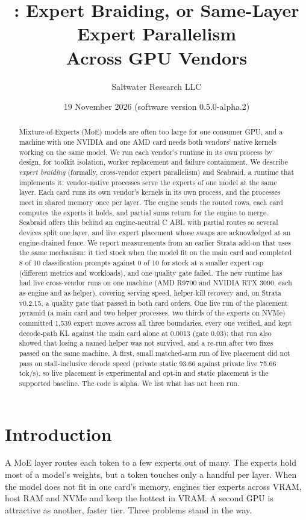 \documentclass[11pt]{article}
\title{\product: Expert Braiding, or Same-Layer Expert Parallelism\\ Across GPU Vendors}
\author{Saltwater Research LLC}
\date{19 November 2026 \quad (software version 0.5.0-alpha.2)}
\newcommand{\product}{Seabraid}                 %
\begin{document}
\maketitle

\begin{abstract}
Mixture-of-Experts (MoE) models are often too large for one consumer GPU, and a machine with one NVIDIA and one AMD
card needs both vendors' native kernels working on the same model. We run each vendor's runtime in its own process by
design, for toolkit isolation, worker replacement and failure containment. We describe \emph{expert braiding} (formally, cross-vendor expert parallelism) and \product, a runtime
that implements it: vendor-native processes serve the experts of one model at the same layer. Each card runs its own
vendor's kernels in its own process, and the processes meet in shared memory once per layer. The engine sends the
routed rows, each card computes the experts it holds, and partial sums return for the engine to merge. \product{} offers
this behind an engine-neutral C ABI, with partial routes so several devices split one layer, and live expert
placement whose swaps are acknowledged at an engine-drained fence. We report measurements from an earlier Strata
add-on that uses the same mechanism: it tied stock when the model fit on the main card and completed 8 of 10
classification prompts against 0 of 10 for stock at a smaller expert cap (different metrics and workloads), and one
quality gate failed. The new runtime has had live cross-vendor runs on one machine (AMD R9700 and NVIDIA RTX 3090,
each as engine and as helper), covering serving speed, helper-kill recovery and, on Strata v0.2.15, a quality gate that
passed in both card orders. One live run of the placement pyramid (a main card and two helper processes, two thirds of
the experts on NVMe) committed 1,539 expert moves across all three boundaries, every one verified, and kept decode-path
KL against the main card alone at 0.0013 (gate 0.03); that run also showed that losing a named helper was not survived, and a re-run after two fixes passed on the same machine.
A first, small matched-arm run of live placement did not pass on stall-inclusive decode speed (private static 93.66
against private live 75.66 tok/s), so live placement is experimental and opt-in and static placement is the supported
baseline. The code is alpha. We list what has not been run.
\end{abstract}

\section{Introduction}
A MoE layer routes each token to a few experts out of many. The experts hold most of a model's weights, but a token
touches only a handful per layer. When the model does not fit in one card's memory, engines tier experts across
VRAM, host RAM and NVMe and keep the hottest in VRAM. A second GPU is attractive as another, faster tier. Three
problems stand in the way.
\end{document}
